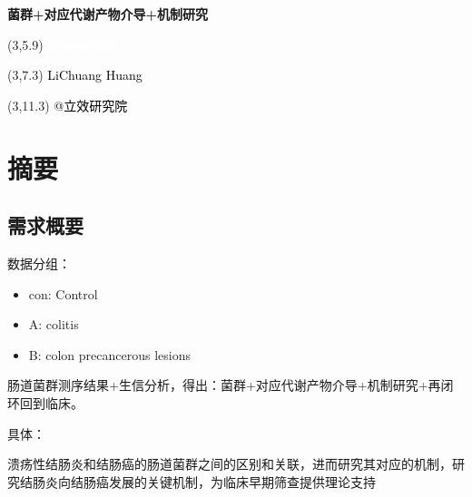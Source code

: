 \documentclass[
]{article}
\author{}
\date{\vspace{-2.5em}}
\providecommand{\tightlist}{%
  \setlength{\itemsep}{0pt}\setlength{\parskip}{0pt}}
\begin{document}
\begin{titlepage} 
\begin{center} \textbf{\Huge
菌群+对应代谢产物介导+机制研究} \vspace{4em}
\begin{textblock}{10}(3,5.9) \huge
\textbf{\textcolor{white}{2024-02-23}}
\end{textblock} \begin{textblock}{10}(3,7.3)
\Large \textcolor{black}{LiChuang Huang}
\end{textblock} \begin{textblock}{10}(3,11.3)
\Large \textcolor{black}{@立效研究院}
\end{textblock} \end{center} \end{titlepage}
\restoregeometry


\tableofcontents

\listoffigures

\listoftables

\newpage


\hypertarget{abstract}{%
\section{摘要}\label{abstract}}

\hypertarget{ux9700ux6c42ux6982ux8981}{%
\subsection{需求概要}\label{ux9700ux6c42ux6982ux8981}}

数据分组：

\begin{itemize}
\tightlist
\item
  con: Control
\item
  A: colitis
\item
  B: colon precancerous lesions
\end{itemize}

肠道菌群测序结果+生信分析，得出：菌群+对应代谢产物介导+机制研究+再闭环回到临床。

具体：

溃疡性结肠炎和结肠癌的肠道菌群之间的区别和关联，进而研究其对应的机制，研究结肠炎向结肠癌发展的关键机制，为临床早期筛查提供理论支持
\end{document}
